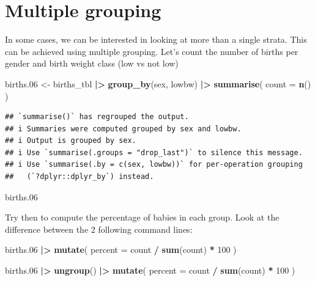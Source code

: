 \documentclass[
]{book}
\newenvironment{Shaded}{\begin{snugshade}}{\end{snugshade}}
\newcommand{\AttributeTok}[1]{\textcolor[rgb]{0.13,0.29,0.53}{#1}}
\newcommand{\DecValTok}[1]{\textcolor[rgb]{0.00,0.00,0.81}{#1}}
\newcommand{\FloatTok}[1]{\textcolor[rgb]{0.00,0.00,0.81}{#1}}
\newcommand{\FunctionTok}[1]{\textcolor[rgb]{0.13,0.29,0.53}{\textbf{#1}}}
\newcommand{\NormalTok}[1]{#1}
\newcommand{\OtherTok}[1]{\textcolor[rgb]{0.56,0.35,0.01}{#1}}
\newcommand{\SpecialCharTok}[1]{\textcolor[rgb]{0.81,0.36,0.00}{\textbf{#1}}}
\begin{document}
\section{Multiple grouping}\label{multiple-grouping}

In some cases, we can be interested in looking at more than a single strata. This can be achieved using multiple grouping.
Let's count the number of births per gender and birth weight class (low vs not low)

\begin{Shaded}
\begin{Highlighting}[]
\NormalTok{births}\FloatTok{.06} \OtherTok{\textless{}{-}}
\NormalTok{  births\_tbl }\SpecialCharTok{|\textgreater{}}
  \FunctionTok{group\_by}\NormalTok{(sex, lowbw) }\SpecialCharTok{|\textgreater{}}
  \FunctionTok{summarise}\NormalTok{(}
    \AttributeTok{count =} \FunctionTok{n}\NormalTok{()}
\NormalTok{  )}
\end{Highlighting}
\end{Shaded}

\begin{verbatim}
## `summarise()` has regrouped the output.
## i Summaries were computed grouped by sex and lowbw.
## i Output is grouped by sex.
## i Use `summarise(.groups = "drop_last")` to silence this message.
## i Use `summarise(.by = c(sex, lowbw))` for per-operation grouping
##   (`?dplyr::dplyr_by`) instead.
\end{verbatim}

\begin{Shaded}
\begin{Highlighting}[]
\NormalTok{births}\FloatTok{.06}
\end{Highlighting}
\end{Shaded}

Try then to compute the percentage of babies in each group.
Look at the difference between the 2 following command lines:

\begin{Shaded}
\begin{Highlighting}[]
\NormalTok{births}\FloatTok{.06} \SpecialCharTok{|\textgreater{}}
  \FunctionTok{mutate}\NormalTok{(}
    \AttributeTok{percent =}\NormalTok{ count }\SpecialCharTok{/} \FunctionTok{sum}\NormalTok{(count) }\SpecialCharTok{*} \DecValTok{100}
\NormalTok{  )}

\NormalTok{births}\FloatTok{.06} \SpecialCharTok{|\textgreater{}}
  \FunctionTok{ungroup}\NormalTok{() }\SpecialCharTok{|\textgreater{}}
  \FunctionTok{mutate}\NormalTok{(}
    \AttributeTok{percent =}\NormalTok{ count }\SpecialCharTok{/} \FunctionTok{sum}\NormalTok{(count) }\SpecialCharTok{*} \DecValTok{100}
\NormalTok{  )}
\end{Highlighting}
\end{Shaded}
\end{document}
